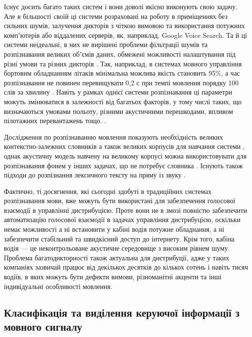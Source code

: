 Існує досить багато таких систем і вони доволі якісно виконують свою задачу. Але в більшості своїй ці системи розраховані на роботу в приміщеннях без сильних шумів, залучення дикторів з чіткою вимовою та використання потужних компʼютерів або віддалених серверів, як, наприклад, Google Voice Search. Та й ці системи неідеальні, в них не вирішені проблеми фільтрації шумів та розпізнавання великих обʼємів даних, обмежені можливості налаштування під різні умови та різних дикторів \cite{Volkov_2014}. Так, наприклад, в системах мовного управління бортовим обладнанням літаків мінімальна можлива якість становить 95\%, а час розпізнавання не повинен перевищувати 0,2 с при темпі мовлення порядку 100 слів за хвилину \cite{Bondaros_2007}. Навіть у рамках однієї системи розпізнавання ці параметри можуть змінюватися в залежності від багатьох факторів, у тому числі таких, що визначаються умовами польоту, різними акустичними перешкодами, впливом пілотажних перевантажень тощо. \cite{Korsun_2013}.

Дослідження по розпізнаванню мовлення показують необхідність великих контекстно-залежних словників а також великих корпусів для навчання системи \cite{Pylypenko_2008,Pylypenko_2009,Pylypenko_2010,Lydovyk_2011,Vasilyeva_2012,Womack_1999,Zirneeva_2008,Gladunov_2005}, однак акустичну модель навчену на великому корпусі можна використовувати для розпізнавання фонем у інших задачах, що не потребує словника \cite{Pylypenko_2008,Robeyko_2012,Abdel_2012,Zhang_2017,Sharma_2018,Yermolenko_2008}. Існують також підходи до розпізнання лексичного тексту на пряму із звуку \cite{He_2019}.

Фактично, ті досягнення, які сьогодні здобуті в традиційних системах розпізнавання мови, вже можуть бути використані для забезпечення голосової взаємодії в управлінні дистрибуцією. Проте вони не в змозі повністю забезпечити автоматизацію голосової взаємодії в задачах управління дистрибуцією, оскільки немає можливості а ні встановити у кабіні водія потужне обладнання, а ні забезпечити стабільний та швидкісний доступ до інтернету. Крім того, кабіна водія — це неконтрольоване акустичне середовище з високим рівнем шуму. Проблема багатодикторності також актуальна для дистрибуції, адже у таких компаніях зазвичай працює від декількох десятків до кількох сотень і навіть тисяч водіїв, в яких можуть бути дефекти вимови, різноманітні акценти та інші індивідуальні особливості мовлення.

\subsection{Класифікація та виділення керуючої інформації з мовного сигналу}

